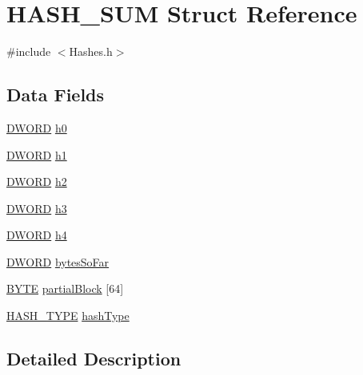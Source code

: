 \hypertarget{struct_h_a_s_h___s_u_m}{}\section{H\+A\+S\+H\+\_\+\+S\+U\+M Struct Reference}
\label{struct_h_a_s_h___s_u_m}


{\ttfamily \#include $<$Hashes.\+h$>$}

\subsection*{Data Fields}
\begin{DoxyCompactItemize}
\item 
\hyperlink{_generic_type_defs_8h_ad342ac907eb044443153a22f964bf0af}{D\+W\+O\+R\+D} \hyperlink{struct_h_a_s_h___s_u_m_abbdac33492375285e49e7a6a91d81abc}{h0}
\item 
\hyperlink{_generic_type_defs_8h_ad342ac907eb044443153a22f964bf0af}{D\+W\+O\+R\+D} \hyperlink{struct_h_a_s_h___s_u_m_afd608f55e737ffc17da3898786d48ee4}{h1}
\item 
\hyperlink{_generic_type_defs_8h_ad342ac907eb044443153a22f964bf0af}{D\+W\+O\+R\+D} \hyperlink{struct_h_a_s_h___s_u_m_a3b3ad813aad409a63b24049ad357e2d6}{h2}
\item 
\hyperlink{_generic_type_defs_8h_ad342ac907eb044443153a22f964bf0af}{D\+W\+O\+R\+D} \hyperlink{struct_h_a_s_h___s_u_m_ac8d255567553c6b07b6dafe02a5e8366}{h3}
\item 
\hyperlink{_generic_type_defs_8h_ad342ac907eb044443153a22f964bf0af}{D\+W\+O\+R\+D} \hyperlink{struct_h_a_s_h___s_u_m_a53c146819ec10d337664b8231e91b718}{h4}
\item 
\hyperlink{_generic_type_defs_8h_ad342ac907eb044443153a22f964bf0af}{D\+W\+O\+R\+D} \hyperlink{struct_h_a_s_h___s_u_m_afa779dd0c79f91156c8783724c01d424}{bytes\+So\+Far}
\item 
\hyperlink{_generic_type_defs_8h_a4ae1dab0fb4b072a66584546209e7d58}{B\+Y\+T\+E} \hyperlink{struct_h_a_s_h___s_u_m_a06e426199b6641cb74f1b9fda4493c0b}{partial\+Block} \mbox{[}64\mbox{]}
\item 
\hyperlink{_hashes_8h_a401b4c26777a00bb04f5fa90f3469b56}{H\+A\+S\+H\+\_\+\+T\+Y\+P\+E} \hyperlink{struct_h_a_s_h___s_u_m_a29ccb4fbdf9c96cc30b969ab76c371e6}{hash\+Type}
\end{DoxyCompactItemize}


\subsection{Detailed Description}


